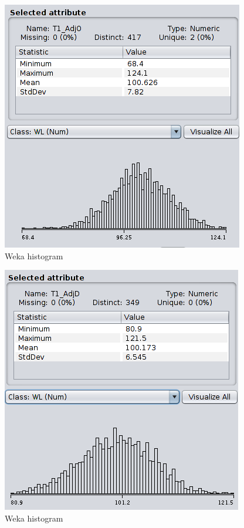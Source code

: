 \documentclass[
10pt, %
a4paper, %
oneside, %
headinclude,footinclude, %
BCOR5mm, %
]{scrartcl}
\begin{document}
\begin{figure}[H]
\caption{Weka histogram}
  \centering
\includegraphics[width=\textwidth]{Weka_Histogram2.png}
\end{figure}

\begin{figure}[H]
\caption{Weka histogram}
  \centering
\includegraphics[width=\textwidth]{Weka_Histogram3.png}
\end{figure}
\end{document}

